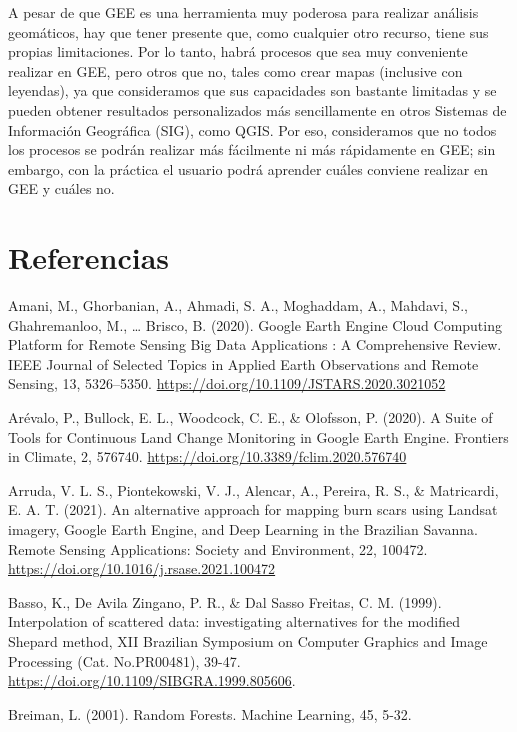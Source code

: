 \documentclass[
  12pt,
  letterpaper,
  twoside]{book}
\begin{document}
A pesar de que GEE es una herramienta muy poderosa para realizar análisis geomáticos, hay que tener presente que, como cualquier otro recurso, tiene sus propias limitaciones. Por lo tanto, habrá procesos que sea muy conveniente realizar en GEE, pero otros que no, tales como crear mapas (inclusive con leyendas), ya que consideramos que sus capacidades son bastante limitadas y se pueden obtener resultados personalizados más sencillamente en otros Sistemas de Información Geográfica (SIG), como QGIS. Por eso, consideramos que no todos los procesos se podrán realizar más fácilmente ni más rápidamente en GEE; sin embargo, con la práctica el usuario podrá aprender cuáles conviene realizar en GEE y cuáles no.

\newpage

\hypertarget{referencias}{%
\chapter{Referencias}\label{referencias}}

Amani, M., Ghorbanian, A., Ahmadi, S. A., Moghaddam, A., Mahdavi, S., Ghahremanloo, M., \ldots{} Brisco, B. (2020). Google Earth Engine Cloud Computing Platform for Remote Sensing Big Data Applications : A Comprehensive Review. IEEE Journal of Selected Topics in Applied Earth Observations and Remote Sensing, 13, 5326--5350. \url{https://doi.org/10.1109/JSTARS.2020.3021052}

Arévalo, P., Bullock, E. L., Woodcock, C. E., \& Olofsson, P. (2020). A Suite of Tools for Continuous Land Change Monitoring in Google Earth Engine. Frontiers in Climate, 2, 576740. \url{https://doi.org/10.3389/fclim.2020.576740}

Arruda, V. L. S., Piontekowski, V. J., Alencar, A., Pereira, R. S., \& Matricardi, E. A. T. (2021). An alternative approach for mapping burn scars using Landsat imagery, Google Earth Engine, and Deep Learning in the Brazilian Savanna. Remote Sensing Applications: Society and Environment, 22, 100472. \url{https://doi.org/10.1016/j.rsase.2021.100472}

Basso, K., De Avila Zingano, P. R., \& Dal Sasso Freitas, C. M. (1999). Interpolation of scattered data: investigating alternatives for the modified Shepard method, XII Brazilian Symposium on Computer Graphics and Image Processing (Cat. No.PR00481), 39-47. \url{https://doi.org/10.1109/SIBGRA.1999.805606}.

Breiman, L. (2001). Random Forests. Machine Learning, 45, 5-32.
\end{document}
